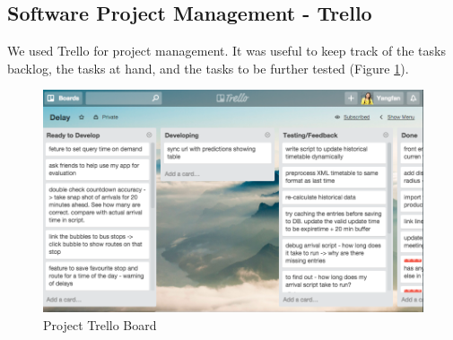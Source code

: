 \subsection{Software Project Management - Trello}
\par We used Trello \cite{trello} for project management. It was useful to keep track of the tasks backlog, the tasks at hand, and the tasks to be further tested (Figure \ref{fig:trello}).

\begin{figure}
\centering
\includegraphics[width=\textwidth]{figures/trello_small.png}
\caption{\label{fig:trello} Project Trello Board}
\end{figure}
